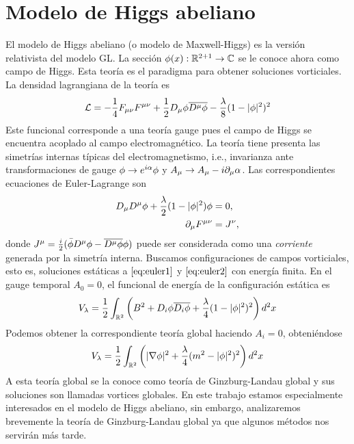 \section{Modelo de Higgs abeliano}

El modelo de Higgs abeliano (o modelo de Maxwell-Higgs) es la versión relativista del modelo GL. La sección $\phi(x):\mathbb{R}^{2+1}\rightarrow\mathbb{C}$ se le conoce ahora como campo de Higgs. Esta teoría es el paradigma para obtener soluciones vorticiales. La densidad lagrangiana de la teoría es
\begin{align}
    \mathcal{L} = -\frac{1}{4} F_{\mu\nu}F^{\mu\nu}+\frac{1}{2}D_\mu\phi\overline{D^\mu\phi}-\frac{\lambda}{8}(1-|\phi|^2)^2 \label{eq:2}
\end{align}
Este funcional corresponde a una teoría gauge pues el campo de Higgs se encuentra acoplado al campo electromagnético. La teoría tiene presenta las simetrías internas típicas del electromagnetismo, i.e., invarianza ante transformaciones de gauge $\phi\rightarrow e^{i\alpha}\phi$ y $A_\mu\rightarrow A_\mu-i\partial_\mu\alpha$. Las correspondientes ecuaciones de Euler-Lagrange son
\begin{align}
    D_\mu D^\mu\phi + \frac{\lambda}{2}(1-|\phi|^2)\phi &=0,\label{eq:euler1}\\
    \partial_\mu F^{\mu\nu} &= J^\nu,\label{eq:euler2}
\end{align}
donde $J^\mu=\frac{i}{2}(\bar\phi D^\mu\phi-\overline{D^\mu\phi}\phi)$ puede ser considerada como una \emph{corriente} generada por la simetría interna. Buscamos configuraciones de campos vorticiales, esto es, soluciones estáticas a $\eqref{eq:euler1}$ y $\eqref{eq:euler2}$ con energía finita. En el gauge temporal $A_0=0$, el funcional de energía de la configuración estática es
\begin{align}
    V_{\lambda} = \frac{1}{2}\int_{\mathbb{R}^2}\left(B^2+D_i\phi\overline{D_i\phi}+\frac{\lambda}{4}(1-|\phi|^2)^2\right)d^2x \label{eq:gl}
\end{align}
Podemos obtener la correspondiente teoría global haciendo $A_i=0$, obteniéndose
\begin{align}
    V_{\lambda} = \frac{1}{2}\int_{\mathbb{R}^2}\left(|\nabla\phi|^2+\frac{\lambda}{4}(m^2-|\phi|^2)^2\right)d^2x \label{eq:3a}
\end{align}
A esta teoría global se la conoce como teoría de Ginzburg-Landau global y sus soluciones son llamadas vortices globales. En este trabajo estamos especialmente interesados en el modelo de Higgs abeliano, sin embargo, analizaremos brevemente la teoría de Ginzburg-Landau global ya que algunos métodos nos servirán más tarde.

